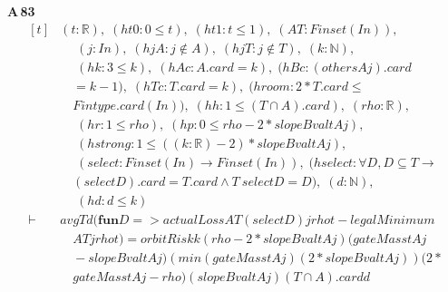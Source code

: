 \noindent\textbf{A\,83}\quad{}
{\footnotesize\[ \begin{aligned}[t]
&(\mathit{t} : \mathbb{R} ),\; (\mathit{ht0} : 0 \leq \mathit{t}),\; (\mathit{ht1} : \mathit{t} \leq 1),\; (\mathit{A} \mathit{T} : \mathit{Finset} (\mathit{I} \mathit{n})),\\
&\quad \; (\mathit{j} : \mathit{I} \mathit{n}),\; (\mathit{hjA} : \mathit{j} \notin \mathit{A}),\; (\mathit{hjT} : \mathit{j} \notin \mathit{T}),\; (\mathit{k} : \mathbb{N} ),\\
&\quad \; (\mathit{hk} : 3 \leq \mathit{k}),\; (\mathit{hAc} : \mathit{A}.\mathit{card}=\mathit{k}),\; (\mathit{hBc} : (\mathit{others} \mathit{A} \mathit{j}).\mathit{card}\\
&\quad =\mathit{k}-1),\; (\mathit{hTc} : \mathit{T}.\mathit{card}=\mathit{k}),\; (\mathit{hroom} : 2*\mathit{T}.\mathit{card} \leq\\
&\quad \mathit{Fintype}.\mathit{card} (\mathit{I} \mathit{n})),\; (\mathit{hh} : 1 \leq (\mathit{T} \cap \mathit{A}).\mathit{card}),\; (\mathit{rho} : \mathbb{R} ),\\
&\quad \; (\mathit{hr} : 1 \leq \mathit{rho}),\; (\mathit{hp} : 0 \leq \mathit{rho}-2*\mathit{slopeBval} \mathit{t} \mathit{A} \mathit{j}),\\
&\quad \; (\mathit{hstrong} : 1 \leq ((\mathit{k}:\mathbb{R} )-2)*\mathit{slopeBval} \mathit{t} \mathit{A} \mathit{j}),\\
&\quad \; (\mathit{select} : \mathit{Finset} (\mathit{I} \mathit{n}) \to \mathit{Finset} (\mathit{I} \mathit{n})),\; (\mathit{hselect} : \forall \mathit{D},\mathit{D} \subseteq \mathit{T} \to\\
&\quad (\mathit{select} \mathit{D}).\mathit{card}=\mathit{T}.\mathit{card} \wedge \mathit{T} \ \mathit{select} \mathit{D}=\mathit{D}),\; (\mathit{d} : \mathbb{N} ),\\
&\quad \; (\mathit{hd} : \mathit{d} \leq \mathit{k})\\
\vdash\;&\mathit{avg} \mathit{T} \mathit{d} (\mathbf{fun} \mathit{D} => \mathit{actualLoss} \mathit{A} \mathit{T} (\mathit{select} \mathit{D}) \mathit{j} \mathit{rho} \mathit{t}-\mathit{legalMinimum}\\
&\quad \mathit{A} \mathit{T} \mathit{j} \mathit{rho} \mathit{t}) = \mathit{orbitRisk} \mathit{k} (\mathit{rho}-2*\mathit{slopeBval} \mathit{t} \mathit{A} \mathit{j}) (\mathit{gateMass} \mathit{t} \mathit{A} \mathit{j}\\
&\quad -\mathit{slopeBval} \mathit{t} \mathit{A} \mathit{j}) (\mathit{min} (\mathit{gateMass} \mathit{t} \mathit{A} \mathit{j}) (2*\mathit{slopeBval} \mathit{t} \mathit{A} \mathit{j})) (2*\\
&\quad \mathit{gateMass} \mathit{t} \mathit{A} \mathit{j}-\mathit{rho}) (\mathit{slopeBval} \mathit{t} \mathit{A} \mathit{j}) (\mathit{T} \cap \mathit{A}).\mathit{card} \mathit{d}
\end{aligned} \]}

